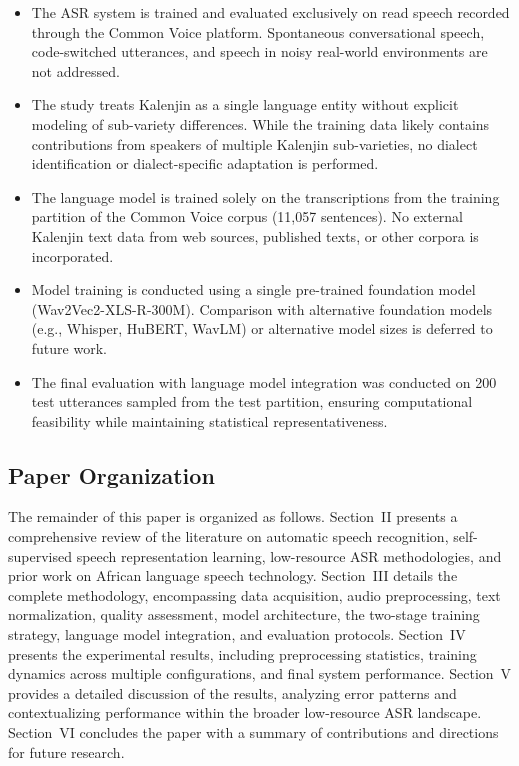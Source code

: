 \documentclass[journal]{IEEEtran}
\begin{document}
\begin{itemize}
    \item The ASR system is trained and evaluated exclusively on read speech recorded through the Common Voice platform. Spontaneous conversational speech, code-switched utterances, and speech in noisy real-world environments are not addressed.

    \item The study treats Kalenjin as a single language entity without explicit modeling of sub-variety differences. While the training data likely contains contributions from speakers of multiple Kalenjin sub-varieties, no dialect identification or dialect-specific adaptation is performed.

    \item The language model is trained solely on the transcriptions from the training partition of the Common Voice corpus (11,057 sentences). No external Kalenjin text data from web sources, published texts, or other corpora is incorporated.

    \item Model training is conducted using a single pre-trained foundation model (Wav2Vec2-XLS-R-300M). Comparison with alternative foundation models (e.g., Whisper, HuBERT, WavLM) or alternative model sizes is deferred to future work.

    \item The final evaluation with language model integration was conducted on 200 test utterances sampled from the test partition, ensuring computational feasibility while maintaining statistical representativeness.
\end{itemize}

\subsection{Paper Organization}

The remainder of this paper is organized as follows. Section~II presents a comprehensive review of the literature on automatic speech recognition, self-supervised speech representation learning, low-resource ASR methodologies, and prior work on African language speech technology. Section~III details the complete methodology, encompassing data acquisition, audio preprocessing, text normalization, quality assessment, model architecture, the two-stage training strategy, language model integration, and evaluation protocols. Section~IV presents the experimental results, including preprocessing statistics, training dynamics across multiple configurations, and final system performance. Section~V provides a detailed discussion of the results, analyzing error patterns and contextualizing performance within the broader low-resource ASR landscape. Section~VI concludes the paper with a summary of contributions and directions for future research.



\end{document}
